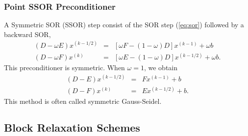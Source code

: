 \subsubsection{Point SSOR Preconditioner}
\label{sec:ssor}

A Symmetric SOR (SSOR) step consist of the SOR step (\ref{eq:sor}) followed by
a backward SOR,
\begin{equation}
\label{eq:ssor}
\begin{array}{rcl}
(D - \omega E) x^{(k-1/2)} &= &[ \omega F - (1 - \omega)D] x^{(k-1)} + \omega b \\
(D - \omega F) x^{(k)} &=& [ \omega E - (1 - \omega)D] x^{(k-1/2)} + \omega b .
\end{array}
\end{equation}
This preconditioner is symmetric. When $\omega = 1$, we obtain
\begin{equation}
\label{eq:sgs}
\begin{array}{rcl}
(D - E) x^{(k-1/2)} &= & F x^{(k-1)} + b \\
(D - F) x^{(k)}     &= & E  x^{(k-1/2)} + b .
\end{array}
\end{equation}
This method
is often called symmetric Gauss-Seidel.

\subsection{Block Relaxation Schemes}
\label{sec:block}

